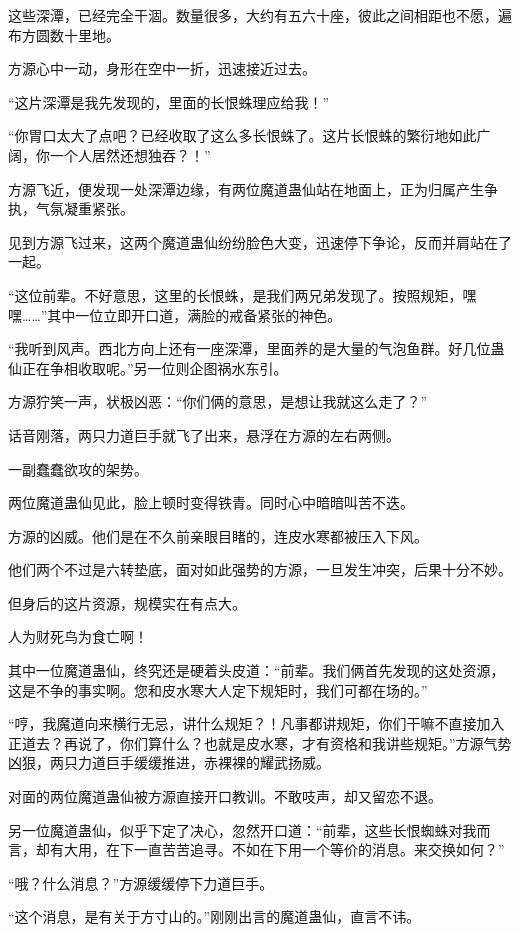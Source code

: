 \begin{this_body}
这些深潭，已经完全干涸。数量很多，大约有五六十座，彼此之间相距也不愿，遍布方圆数十里地。

方源心中一动，身形在空中一折，迅速接近过去。

“这片深潭是我先发现的，里面的长恨蛛理应给我！”

“你胃口太大了点吧？已经收取了这么多长恨蛛了。这片长恨蛛的繁衍地如此广阔，你一个人居然还想独吞？！”

方源飞近，便发现一处深潭边缘，有两位魔道蛊仙站在地面上，正为归属产生争执，气氛凝重紧张。

见到方源飞过来，这两个魔道蛊仙纷纷脸色大变，迅速停下争论，反而并肩站在了一起。

“这位前辈。不好意思，这里的长恨蛛，是我们两兄弟发现了。按照规矩，嘿嘿……”其中一位立即开口道，满脸的戒备紧张的神色。

“我听到风声。西北方向上还有一座深潭，里面养的是大量的气泡鱼群。好几位蛊仙正在争相收取呢。”另一位则企图祸水东引。

方源狞笑一声，状极凶恶：“你们俩的意思，是想让我就这么走了？”

话音刚落，两只力道巨手就飞了出来，悬浮在方源的左右两侧。

一副蠢蠢欲攻的架势。

两位魔道蛊仙见此，脸上顿时变得铁青。同时心中暗暗叫苦不迭。

方源的凶威。他们是在不久前亲眼目睹的，连皮水寒都被压入下风。

他们两个不过是六转垫底，面对如此强势的方源，一旦发生冲突，后果十分不妙。

但身后的这片资源，规模实在有点大。

人为财死鸟为食亡啊！

其中一位魔道蛊仙，终究还是硬着头皮道：“前辈。我们俩首先发现的这处资源，这是不争的事实啊。您和皮水寒大人定下规矩时，我们可都在场的。”

“哼，我魔道向来横行无忌，讲什么规矩？！凡事都讲规矩，你们干嘛不直接加入正道去？再说了，你们算什么？也就是皮水寒，才有资格和我讲些规矩。”方源气势凶狠，两只力道巨手缓缓推进，赤裸裸的耀武扬威。

对面的两位魔道蛊仙被方源直接开口教训。不敢吱声，却又留恋不退。

另一位魔道蛊仙，似乎下定了决心，忽然开口道：“前辈，这些长恨蜘蛛对我而言，却有大用，在下一直苦苦追寻。不如在下用一个等价的消息。来交换如何？”

“哦？什么消息？”方源缓缓停下力道巨手。

“这个消息，是有关于方寸山的。”刚刚出言的魔道蛊仙，直言不讳。


\end{this_body}
